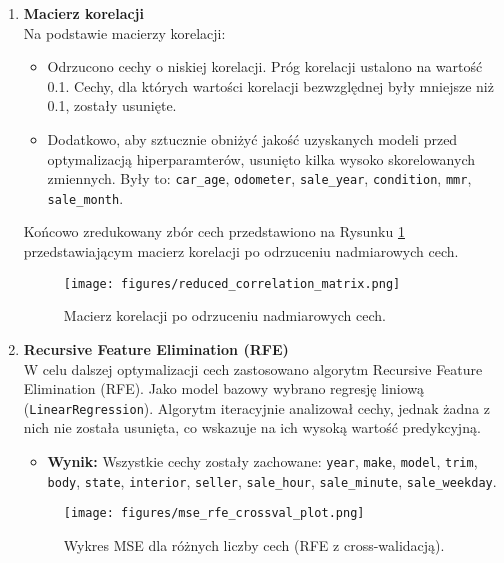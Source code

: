 \documentclass[10pt,letterpaper]{article}
\begin{document}
\begin{enumerate}
	\item \textbf{Macierz korelacji}\\
	Na podstawie macierzy korelacji:
	\begin{itemize}
		\item Odrzucono cechy o niskiej korelacji. Próg korelacji ustalono na wartość 0.1. Cechy, dla których wartości korelacji bezwzględnej były mniejsze niż 0.1, zostały usunięte.
		\item Dodatkowo, aby sztucznie obniżyć jakość uzyskanych modeli przed optymalizacją hiperparamterów, usunięto kilka wysoko skorelowanych zmiennych. Były to: \texttt{car\_age}, \texttt{odometer}, \texttt{sale\_year}, \texttt{condition}, \texttt{mmr}, \texttt{sale\_month}.
	\end{itemize}
	Końcowo zredukowany zbór cech przedstawiono na Rysunku \ref{fig:reduced_correlation_matrix} przedstawiającym macierz korelacji po odrzuceniu nadmiarowych cech.
	
	\begin{figure}[H]
		\centering
		\texttt{[image: figures/reduced\_correlation\_matrix.png]}
		\caption{Macierz korelacji po odrzuceniu nadmiarowych cech.}
		\label{fig:reduced_correlation_matrix}
	\end{figure}
	
	\item \textbf{Recursive Feature Elimination (RFE)}\\
	W celu dalszej optymalizacji cech zastosowano algorytm Recursive Feature Elimination (RFE). Jako model bazowy wybrano regresję liniową (\texttt{LinearRegression}). Algorytm iteracyjnie analizował cechy, jednak żadna z nich nie została usunięta, co wskazuje na ich wysoką wartość predykcyjną.
	\begin{itemize}
		\item \textbf{Wynik:} Wszystkie cechy zostały zachowane: 
		\texttt{year}, \texttt{make}, \texttt{model}, \texttt{trim}, \texttt{body}, \texttt{state}, \texttt{interior}, \texttt{seller}, \texttt{sale\_hour}, \texttt{sale\_minute}, \texttt{sale\_weekday}.
	\end{itemize}
	
	\begin{figure}[H]
		\centering
		\texttt{[image: figures/mse\_rfe\_crossval\_plot.png]}
		\caption{Wykres MSE dla różnych liczby cech (RFE z cross-walidacją).}
		\label{fig:mse_rfe_crossval_plot}
	\end{figure}
	

\end{enumerate}
\end{document}
